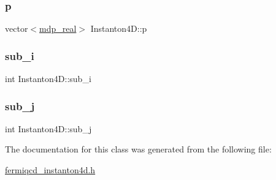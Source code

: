 \subsubsection{\texorpdfstring{p}{p}}
{\footnotesize\ttfamily vector$<$\hyperlink{mdp__global__vars_8h_a69d96b74c791e0bbdb888b3913a69450}{mdp\+\_\+real}$>$ Instanton4\+D\+::p}

\mbox{\label{class_instanton4_d_a33c37212ef923556b7a1985d9e7cdd36}} 
\subsubsection{\texorpdfstring{sub\+\_\+i}{sub\_i}}
{\footnotesize\ttfamily int Instanton4\+D\+::sub\+\_\+i}

\mbox{\label{class_instanton4_d_af73c30a26883977d21e2b2e8921429cf}} 
\subsubsection{\texorpdfstring{sub\+\_\+j}{sub\_j}}
{\footnotesize\ttfamily int Instanton4\+D\+::sub\+\_\+j}



The documentation for this class was generated from the following file\+:\begin{DoxyCompactItemize}
\item 
\hyperlink{fermiqcd__instanton4d_8h}{fermiqcd\+\_\+instanton4d.\+h}\end{DoxyCompactItemize}
